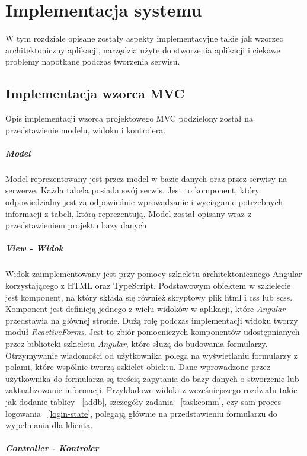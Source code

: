 \chapter{Implementacja systemu}
\thispagestyle{chapterBeginStyle}
W tym rozdziale opisane zostały aspekty implementacyjne takie jak wzorzec architektoniczny aplikacji, narzędzia użyte do stworzenia aplikacji i ciekawe problemy napotkane podczas tworzenia serwisu.
\section{Implementacja  wzorca  MVC}
Opis implementacji wzorca projektowego MVC podzielony został na przedstawienie modelu, widoku i kontrolera.
\paragraph{Model}

Model reprezentowany jest przez model w bazie danych oraz przez serwisy na serwerze. 
Każda tabela posiada swój serwis. Jest to komponent, który odpowiedzialny jest za odpowiednie wprowadzanie i wyciąganie potrzebnych informacji z tabeli, którą reprezentują. Model został opisany wraz z przedstawieniem projektu bazy danych 
\paragraph{View - Widok}


Widok zaimplementowany jest przy pomocy szkieletu architektonicznego Angular korzystającego z HTML oraz TypeScript. Podstawowym obiektem w szkielecie jest komponent, na który składa się również skryptowy plik html i css lub scss. Komponent jest definicją jednego z wielu widoków w aplikacji, które \textit{Angular} przedstawia na głównej stronie. Dużą rolę podczas implementacji widoku tworzy moduł \textit{ReactiveForms}. Jest to zbiór pomocniczych komponentów udostępnianych przez biblioteki szkieletu \textit{Angular}, które służą do budowania formularzy. Otrzymywanie wiadomości od użytkownika polega na wyświetlaniu formularzy z polami, które wspólnie tworzą szkielet obiektu. Dane wprowadzone przez użytkownika do formularza są treścią zapytania do bazy danych o stworzenie lub zaktualizowanie informacji.  Przykładowe widoki z wcześniejszego rozdziału takie jak dodanie tablicy ~\ref{addb}, szczegóły zadania ~\ref{taskcomm}, czy sam proces logowania ~\ref{login-state}, polegają głównie na przedstawieniu formularzu do wypełniania dla klienta.
\paragraph{Controller - Kontroler}


